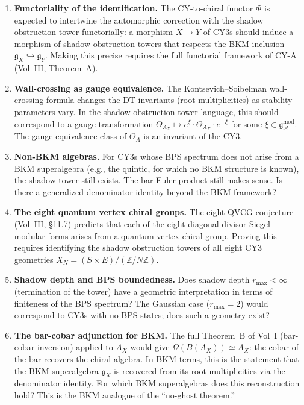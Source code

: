 \documentclass[11pt]{amsart}
\theoremstyle{definition}
\theoremstyle{remark}
\newcommand{\cA}{\mathcal{A}}
\newcommand{\fg}{\mathfrak{g}}
\newcommand{\gmod}{\mathfrak{g}^{\mathrm{mod}}_\cA}
\begin{document}
\begin{enumerate}
 \item \textbf{Functoriality of the identification.} The
 CY-to-chiral functor $\Phi$ is expected to intertwine the
 automorphic correction with the shadow obstruction tower functorially:
 a morphism $X \to Y$ of CY3s should induce a morphism of
 shadow obstruction towers that respects the BKM inclusion $\fg_X
 \hookrightarrow \fg_Y$. Making this precise requires the
 full functorial framework of CY-A (Vol~III, Theorem~A).

 \item \textbf{Wall-crossing as gauge equivalence.} The
 Kontsevich--Soibelman wall-crossing formula changes the DT
 invariants (root multiplicities) as stability parameters
 vary. In the shadow obstruction tower language, this should correspond
 to a gauge transformation $\Theta_{A_X} \mapsto
 e^{\xi} \cdot \Theta_{A_X} \cdot e^{-\xi}$ for some
 $\xi \in \gmod$. The gauge equivalence class of $\Theta_A$
 is an invariant of the CY3.

 \item \textbf{Non-BKM algebras.} For CY3s whose BPS
 spectrum does not arise from a BKM superalgebra (e.g., the
 quintic, for which no BKM structure is known), the shadow
 tower still exists. The bar Euler product still makes
 sense. Is there a generalized denominator identity beyond
 the BKM framework?

 \item \textbf{The eight quantum vertex chiral groups.}
 The eight-QVCG conjecture (Vol~III, \S11.7) predicts that
 each of the eight diagonal divisor Siegel modular forms
 arises from a quantum vertex chiral group. Proving this
 requires identifying the shadow obstruction towers of all eight CY3
 geometries $X_N = (S \times E)/(\mathbb{Z}/N\mathbb{Z})$.

 \item \textbf{Shadow depth and BPS boundedness.} Does shadow
 depth $r_{\max} < \infty$ (termination of the tower) have
 a geometric interpretation in terms of finiteness of the
 BPS spectrum? The Gaussian case ($r_{\max} = 2$) would
 correspond to CY3s with no BPS states; does such a
 geometry exist?

 \item \textbf{The bar-cobar adjunction for BKM.} The full
 Theorem~B of Vol~I (bar-cobar inversion) applied to $A_X$
 would give $\Omega(B(A_X)) \simeq A_X$: the cobar of the
 bar recovers the chiral algebra. In BKM terms, this is
 the statement that the BKM superalgebra $\fg_X$ is
 recovered from its root multiplicities via the denominator
 identity. For which BKM superalgebras does this reconstruction
 hold? This is the BKM analogue of the ``no-ghost theorem.''
\end{enumerate}
\end{document}

